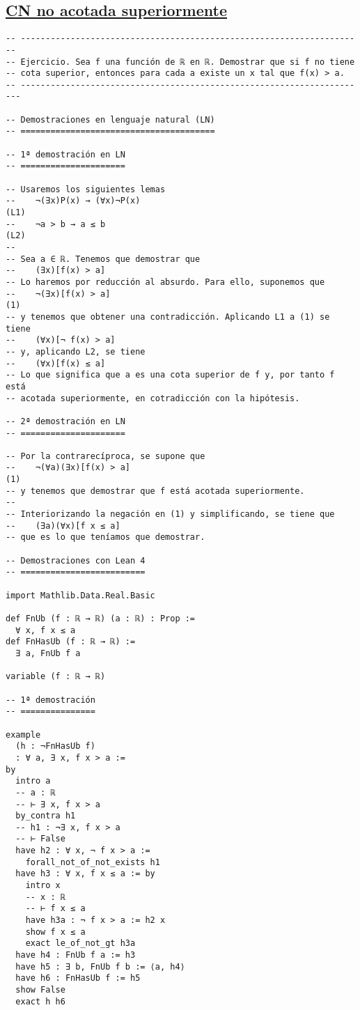 \subsection{\href{./src/Logica/CN\_no\_acotada\_superiormente.lean}{CN no acotada superiormente}}
\label{sec:orgdc8b4dc}
\begin{verbatim}
-- ---------------------------------------------------------------------
-- Ejercicio. Sea f una función de ℝ en ℝ. Demostrar que si f no tiene
-- cota superior, entonces para cada a existe un x tal que f(x) > a.
-- ----------------------------------------------------------------------

-- Demostraciones en lenguaje natural (LN)
-- =======================================

-- 1ª demostración en LN
-- =====================

-- Usaremos los siguientes lemas
--    ¬(∃x)P(x) → (∀x)¬P(x)                                          (L1)
--    ¬a > b → a ≤ b                                                 (L2)
--
-- Sea a ∈ ℝ. Tenemos que demostrar que
--    (∃x)[f(x) > a]
-- Lo haremos por reducción al absurdo. Para ello, suponemos que
--    ¬(∃x)[f(x) > a]                                                (1)
-- y tenemos que obtener una contradicción. Aplicando L1 a (1) se tiene
--    (∀x)[¬ f(x) > a]
-- y, aplicando L2, se tiene
--    (∀x)[f(x) ≤ a]
-- Lo que significa que a es una cota superior de f y, por tanto f está
-- acotada superiormente, en cotradicción con la hipótesis.

-- 2ª demostración en LN
-- =====================

-- Por la contrarecíproca, se supone que
--    ¬(∀a)(∃x)[f(x) > a]                                             (1)
-- y tenemos que demostrar que f está acotada superiormente.
--
-- Interiorizando la negación en (1) y simplificando, se tiene que
--    (∃a)(∀x)[f x ≤ a]
-- que es lo que teníamos que demostrar.

-- Demostraciones con Lean 4
-- =========================

import Mathlib.Data.Real.Basic

def FnUb (f : ℝ → ℝ) (a : ℝ) : Prop :=
  ∀ x, f x ≤ a
def FnHasUb (f : ℝ → ℝ) :=
  ∃ a, FnUb f a

variable (f : ℝ → ℝ)

-- 1ª demostración
-- ===============

example
  (h : ¬FnHasUb f)
  : ∀ a, ∃ x, f x > a :=
by
  intro a
  -- a : ℝ
  -- ⊢ ∃ x, f x > a
  by_contra h1
  -- h1 : ¬∃ x, f x > a
  -- ⊢ False
  have h2 : ∀ x, ¬ f x > a :=
    forall_not_of_not_exists h1
  have h3 : ∀ x, f x ≤ a := by
    intro x
    -- x : ℝ
    -- ⊢ f x ≤ a
    have h3a : ¬ f x > a := h2 x
    show f x ≤ a
    exact le_of_not_gt h3a
  have h4 : FnUb f a := h3
  have h5 : ∃ b, FnUb f b := ⟨a, h4⟩
  have h6 : FnHasUb f := h5
  show False
  exact h h6


\end{verbatim}
